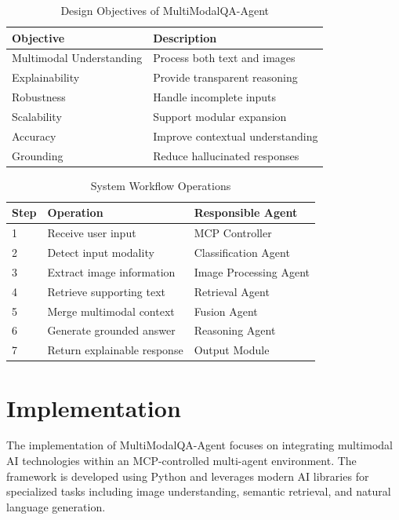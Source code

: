 \documentclass[conference]{IEEEtran}
\begin{document}
\begin{table}[htbp]
\centering
\caption{Design Objectives of MultiModalQA-Agent}
\label{tab:objectives}
\begin{tabular}{|l|l|}
\hline
\textbf{Objective} & \textbf{Description} \\ \hline
Multimodal Understanding & Process both text and images \\ \hline
Explainability & Provide transparent reasoning \\ \hline
Robustness & Handle incomplete inputs \\ \hline
Scalability & Support modular expansion \\ \hline
Accuracy & Improve contextual understanding \\ \hline
Grounding & Reduce hallucinated responses \\ \hline
\end{tabular}
\end{table}


\begin{table}[htbp]
\centering
\caption{System Workflow Operations}
\label{tab:workflow}
\begin{tabular}{|l|l|l|}
\hline
\textbf{Step} & \textbf{Operation} & \textbf{Responsible Agent} \\ \hline
1 & Receive user input & MCP Controller \\ \hline
2 & Detect input modality & Classification Agent \\ \hline
3 & Extract image information & Image Processing Agent \\ \hline
4 & Retrieve supporting text & Retrieval Agent \\ \hline
5 & Merge multimodal context & Fusion Agent \\ \hline
6 & Generate grounded answer & Reasoning Agent \\ \hline
7 & Return explainable response & Output Module \\ \hline
\end{tabular}
\end{table}

\section{Implementation}
The implementation of MultiModalQA-Agent focuses on integrating multimodal AI technologies within an MCP-controlled multi-agent environment. The framework is developed using Python and leverages modern AI libraries for specialized tasks including image understanding, semantic retrieval, and natural language generation.
\end{document}
